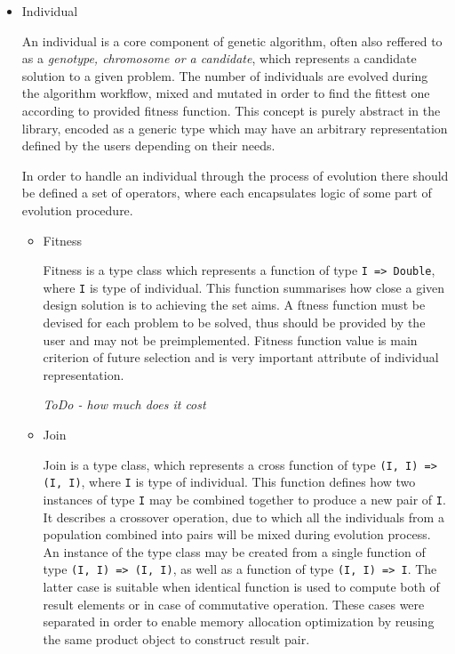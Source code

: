 \begin{itemize}

\item
Individual

An individual is a core component of genetic algorithm, often also reffered to as a \textit{genotype, chromosome \emph{or} a candidate}, which represents a candidate solution to a given problem. The number of individuals are evolved during the algorithm workflow, mixed and mutated in order to find the fittest one according to provided fitness function. This concept is purely abstract in the library, encoded as a generic type which may have an arbitrary representation defined by the users depending on their needs. 

In order to handle an individual through the process of evolution there should be defined a set of operators, where each encapsulates logic of some part of evolution procedure.   
\medbreak

\begin{itemize}
\item
Fitness

Fitness is a type class which represents a function of type \texttt{I => Double}, where \texttt{I} is type of individual. This function summarises how close a given design solution is to achieving the set aims. A ftness function must be devised for each problem to be solved, thus should be provided by the user and may not be preimplemented. Fitness function value is main criterion of future selection and is very important attribute of individual representation.

\textit{ToDo - how much does it cost}
\medbreak

\item
Join

Join is a type class, which represents a cross function of type \texttt{(I, I) => (I, I)}, where \texttt{I} is type of individual. This function defines how two instances of type \texttt{I} may be combined together to produce a new pair of \texttt{I}. It describes a crossover operation, due to which all the individuals from a population combined into pairs will be mixed during evolution process. An instance of the type class may be created from a single function of type \texttt{(I, I) => (I, I)}, as well as a function of type \texttt{(I, I) => I}. The latter case is suitable when identical function is used to compute both of result elements or in case of commutative operation. These cases were separated in order to enable memory allocation optimization by reusing the same product object to construct result pair.
\medbreak


\end{itemize}
\end{itemize}
